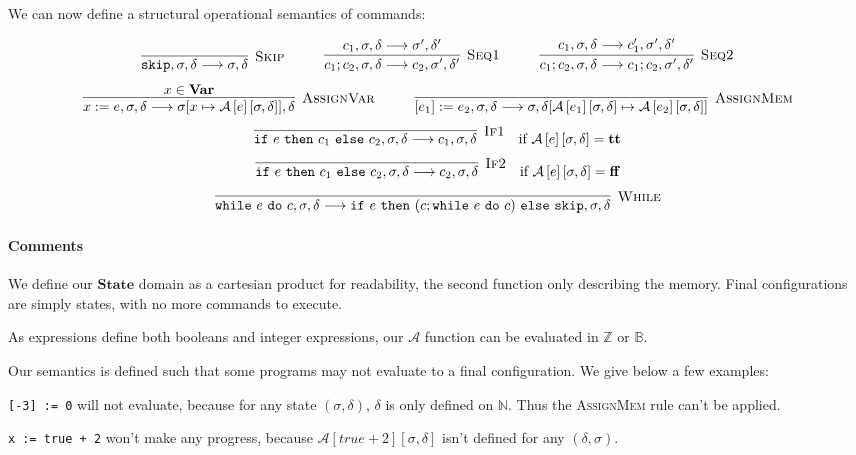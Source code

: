 \documentclass{article}
\newcommand{\var}{\mathbf{Var}}
\newcommand{\state}{\mathbf{State}}
\newcommand{\A}{\mathcal{A}}
\newcommand{\Aa}[2]{\mathcal{A}\left[#1\right]\left[#2\right]}
\newcommand{\true}{\mathbf{tt}}
\newcommand{\false}{\mathbf{ff}}
\newcommand{\Rule}[3]{\infer[\textsc{#1}]{#2}{#3}}
\begin{document}
We can now define a structural operational semantics of commands:

\[
	\Rule{Skip}{\texttt{skip}, \sigma, \delta \longrightarrow \sigma, \delta}{} \hspace*{1cm}
	\Rule{Seq1}{c_1 ; c_2, \sigma, \delta \longrightarrow c_2, \sigma', \delta'}{c_1, \sigma, \delta \longrightarrow \sigma', \delta'} \hspace*{1cm}
	\Rule{Seq2}{c_1 ; c_2, \sigma, \delta \longrightarrow c_1 ; c_2, \sigma', \delta'}{c_1, \sigma, \delta \longrightarrow c_1', \sigma', \delta'}
\]
\[
	\Rule{AssignVar}{x := e, \sigma, \delta \longrightarrow \sigma[x \mapsto \Aa{e}{\sigma, \delta}], \delta}{x \in \var{}} \hspace*{1cm}
	\Rule{AssignMem}{[e_1] := e_2, \sigma, \delta \longrightarrow \sigma, \delta[\Aa{e_1}{\sigma, \delta} \mapsto \Aa{e_2}{\sigma, \delta}]}{}
\]
\[
	\Rule{If1}{\texttt{if}~e~\texttt{then}~c_1~\texttt{else}~c_2, \sigma, \delta \longrightarrow c_1, \sigma, \delta}{} \quad \text{if $\Aa{e}{\sigma, \delta} = \true{}$}
\]
\[
	\Rule{If2}{\texttt{if}~e~\texttt{then}~c_1~\texttt{else}~c_2, \sigma, \delta \longrightarrow c_2, \sigma, \delta}{} \quad \text{if $\Aa{e}{\sigma, \delta} = \false{}$}
\]
\[
	\Rule{While}{\texttt{while}~e~\texttt{do}~c, \sigma, \delta \longrightarrow \texttt{if}~e~\texttt{then}~(c; \texttt{while}~e~\texttt{do}~c)~\texttt{else}~\texttt{skip}, \sigma, \delta}{} 
\]

\paragraph{Comments}
We define our $\state$ domain as a cartesian product for readability, the second function only describing the memory.
Final configurations are simply states, with no more commands to execute.

As expressions define both booleans and integer expressions, our $\A{}$ function can be evaluated in $\mathbb{Z}$ or $\mathbb{B}$.

Our semantics is defined such that some programs may not evaluate to a final configuration. We give below a few examples:

\texttt{[-3] := 0} will not evaluate, because for any state $(\sigma,\delta)$, $\delta$ is only defined on $\mathbb{N}$. Thus the \textsc{AssignMem} rule can't be applied.

\texttt{x := true + 2} won't make any progress, because $\Aa{true + 2}{\sigma,\delta}$ isn't defined for any $(\delta,\sigma)$.
\end{document}

